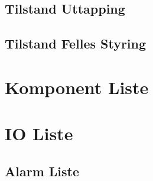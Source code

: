 \section{Tilstand Uttapping}
\section{Tilstand Felles Styring}

\chapter{Komponent Liste}

\chapter{IO Liste}
\section{Alarm Liste}